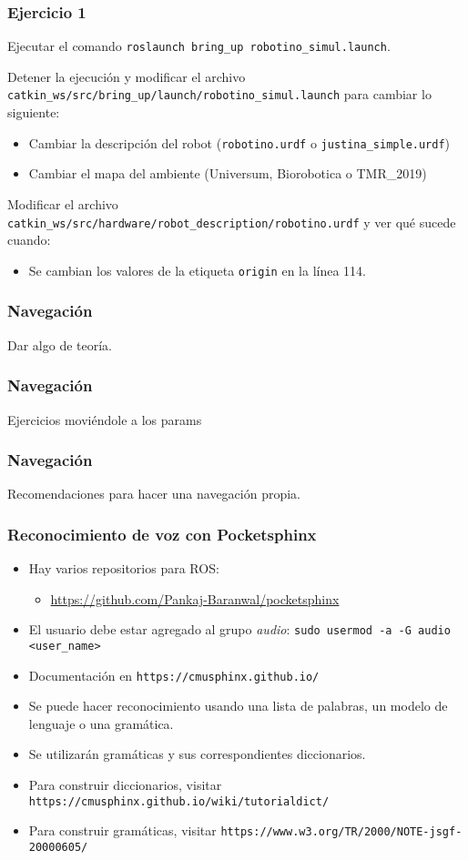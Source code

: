 \documentclass[10pt,spanish,aspectratio=1610]{beamer}
\begin{document}
\begin{frame}\frametitle{Ejercicio 1}
  Ejecutar el comando \texttt{roslaunch bring\_up robotino\_simul.launch}.
  
  Detener la ejecución y modificar el archivo \texttt{catkin\_ws/src/bring\_up/launch/robotino\_simul.launch} para cambiar lo siguiente:
  \begin{itemize}
  \item Cambiar la descripción del robot (\texttt{robotino.urdf} o \texttt{justina\_simple.urdf})
  \item Cambiar el mapa del ambiente (Universum, Biorobotica o TMR\_2019)
  \end{itemize}
  Modificar el archivo \texttt{catkin\_ws/src/hardware/robot\_description/robotino.urdf} y ver qué sucede cuando:
  \begin{itemize}
  \item Se cambian los valores de la etiqueta \texttt{origin} en la línea 114. 
  \end{itemize}
\end{frame}

\begin{frame}\frametitle{Navegación}
  Dar algo de teoría. 
\end{frame}

\begin{frame}\frametitle{Navegación}
  Ejercicios moviéndole a los params
\end{frame}

\begin{frame}\frametitle{Navegación}
  Recomendaciones para hacer una navegación propia. 
\end{frame}

\begin{frame}\frametitle{Reconocimiento de voz con Pocketsphinx}
  \begin{itemize}
  \item Hay varios repositorios para ROS:
    \begin{itemize}
    \item \url{https://github.com/Pankaj-Baranwal/pocketsphinx}
    \end{itemize}
  \item El usuario debe estar agregado al grupo \textit{audio}: \texttt{sudo usermod -a -G audio <user\_name>}
  \item Documentación en \texttt{https://cmusphinx.github.io/}
  \item Se puede hacer reconocimiento usando una lista de palabras, un modelo de lenguaje o una gramática.
  \item Se utilizarán gramáticas y sus correspondientes diccionarios.
  \item Para construir diccionarios, visitar \texttt{https://cmusphinx.github.io/wiki/tutorialdict/}
  \item Para construir gramáticas, visitar \texttt{https://www.w3.org/TR/2000/NOTE-jsgf-20000605/}
  \end{itemize}
\end{frame}
\end{document}
